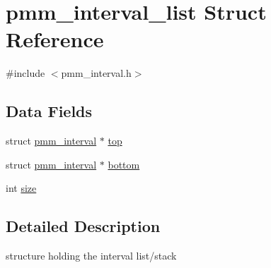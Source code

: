 \hypertarget{structpmm__interval__list}{\section{pmm\-\_\-interval\-\_\-list Struct Reference}
\label{structpmm__interval__list}
}


{\ttfamily \#include $<$pmm\-\_\-interval.\-h$>$}

\subsection*{Data Fields}
\begin{DoxyCompactItemize}
\item 
struct \hyperlink{structpmm__interval}{pmm\-\_\-interval} $\ast$ \hyperlink{structpmm__interval__list_a659e2b8ffd36ea360d2a0259030f38c1}{top}
\item 
struct \hyperlink{structpmm__interval}{pmm\-\_\-interval} $\ast$ \hyperlink{structpmm__interval__list_ab3a8d91a9f36e0cf7d50aede9b0fc238}{bottom}
\item 
int \hyperlink{structpmm__interval__list_aadf8e9335403b3f0d3898e9d99c0b07d}{size}
\end{DoxyCompactItemize}


\subsection{Detailed Description}
structure holding the interval list/stack 

